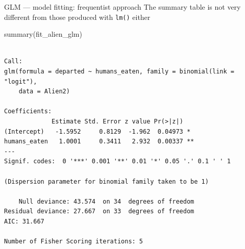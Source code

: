 \documentclass[
  10pt,
  ignorenonframetext,
  aspectratio=169,
  t]{beamer}
\newenvironment{Shaded}{\begin{snugshade}}{\end{snugshade}}
\newcommand{\FunctionTok}[1]{\textcolor[rgb]{0.28,0.35,0.67}{#1}}
\newcommand{\NormalTok}[1]{\textcolor[rgb]{0.00,0.23,0.31}{#1}}
\let\oldtexttt\texttt
\renewcommand{\texttt}[1]{\colorbox{gray!20}{\oldtexttt{#1}}}
\begin{document}
\begin{frame}[fragile]{GLM --- model fitting: frequentist approach}
\protect{}\label{glm-model-fitting-frequentist-approach-1}
The summary table is not very different from those produced with
\texttt{lm()} either

\scriptsize

\begin{Shaded}
\begin{Highlighting}[]
\FunctionTok{summary}\NormalTok{(fit\_alien\_glm)}
\end{Highlighting}
\end{Shaded}

\begin{verbatim}

Call:
glm(formula = departed ~ humans_eaten, family = binomial(link = "logit"), 
    data = Alien2)

Coefficients:
             Estimate Std. Error z value Pr(>|z|)   
(Intercept)   -1.5952     0.8129  -1.962  0.04973 * 
humans_eaten   1.0001     0.3411   2.932  0.00337 **
---
Signif. codes:  0 '***' 0.001 '**' 0.01 '*' 0.05 '.' 0.1 ' ' 1

(Dispersion parameter for binomial family taken to be 1)

    Null deviance: 43.574  on 34  degrees of freedom
Residual deviance: 27.667  on 33  degrees of freedom
AIC: 31.667

Number of Fisher Scoring iterations: 5
\end{verbatim}

\normalsize
\end{frame}
\end{document}
